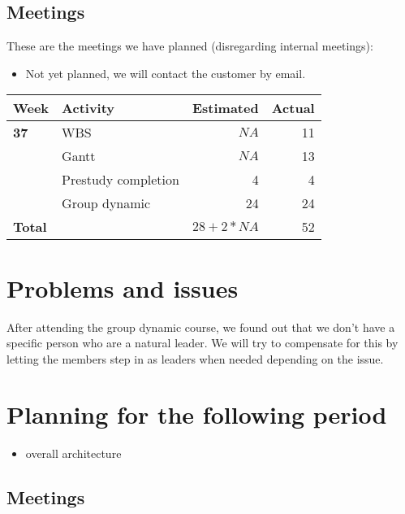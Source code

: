 \documentclass[12pt, a4paper]{article}
\begin{document}
\subsection{Meetings}
These are the meetings we have planned (disregarding internal meetings):
\begin{itemize}
\item Not yet planned, we will contact the customer by email.
\end{itemize}
  \begin{tabular}{| l | l | r | r |}
    \hline
    \textbf{Week} & \textbf{Activity} & \textbf{Estimated} & \textbf{Actual}\\ \hline
    \textbf{37} & WBS & $NA$ & 11 \\ \hline
     & Gantt & $NA$ & 13 \\ \hline
     & Prestudy completion & 4 & 4 \\ \hline
     & Group dynamic & 24 & 24  \\ \hline
     \textbf{Total }&  & $28+2*NA$ & 52 \\
    \hline
  \end{tabular}


\section{Problems and issues}
After attending the group dynamic course, we found out that we don't have a specific person who are a natural leader. We will try to compensate for this by letting the members step in as leaders when needed depending on the issue.
\section{Planning for the following period}
\begin{itemize}
\item overall architecture

\end{itemize}
\subsection{Meetings}
\newpage
\end{document}
